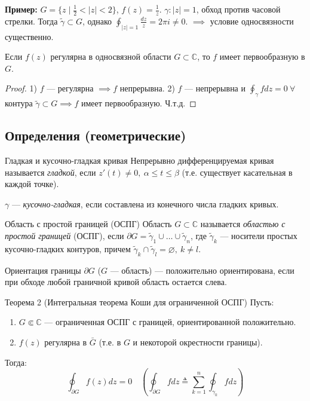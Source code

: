 \textbf{Пример:} $G = \{z \mid \frac{1}{2} < |z| < 2 \}$, $f(z) = \frac{1}{z}$.
$\gamma : |z| = 1$, обход против часовой стрелки.
Тогда $\tilde{\gamma} \subset G$, однако $\oint_{|z|=1} \frac{dz}{z} = 2\pi i \ne 0$.
$\implies$ условие односвязности существенно.

\begin{conseq}
    Если $f(z)$ регулярна в односвязной области $G \subset \mathbb{C}$, то $f$ имеет первообразную в $G$.
\end{conseq}
\begin{proof}
    1) $f$ — регулярна $\implies f$ непрерывна.
    2) $f$ — непрерывна и $\oint_{\gamma} f dz = 0 ~ \forall$ контура $\tilde{\gamma} \subset G \implies f$ имеет первообразную. Ч.т.д.
\end{proof}

\subsection*{Определения (геометрические)}

\begin{definition}{Гладкая и кусочно-гладкая кривая}
    Непрерывно дифференцируемая кривая называется \textit{гладкой}, если $z'(t) \ne 0, ~ \alpha \le t \le \beta$ (т.е. существует касательная в каждой точке).
    
    $\gamma$ — \textit{кусочно-гладкая}, если составлена из конечного числа гладких кривых.
\end{definition}

\begin{definition}{Область с простой границей (ОСПГ)}
    Область $G \subset \mathbb{C}$ называется \textit{областью с простой границей} (ОСПГ), если $\partial G = \tilde{\gamma}_1 \cup \dots \cup \tilde{\gamma}_n$, где $\tilde{\gamma}_k$ — носители простых кусочно-гладких контуров, причем $\tilde{\gamma}_k \cap \tilde{\gamma}_l = \varnothing, ~ k \ne l$.
\end{definition}

\begin{definition}{Ориентация границы}
    $\partial G$ ($G$ — область) — положительно ориентирована, если при обходе любой граничной кривой область остается слева.
\end{definition}

\begin{theorem}{Теорема 2 (Интегральная теорема Коши для ограниченной ОСПГ)}
    Пусть:
    \begin{enumerate}
        \item $G \Subset \mathbb{C}$ — ограниченная ОСПГ с границей, ориентированной положительно.
        \item $f(z)$ регулярна в $\bar{G}$ (т.е. в $G$ и некоторой окрестности границы).
    \end{enumerate}
    Тогда:
    \begin{equation} \label{eq:19.3}
        \oint_{\partial G} f(z) dz = 0 \quad \left( \oint_{\partial G} f dz \triangleq \sum_{k=1}^{n} \oint_{\gamma_k} f dz \right)
    \end{equation}
\end{theorem}

